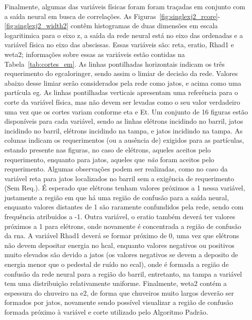 Finalmente, algumas das variáveis físicas foram foram traçadas em conjunto com
a saída neural em busca de correlações. As
Figuras~\ref{fig:singlexj2_rcore}-\ref{fig:singlexj2_width2} contêm histogramas
de duas dimensões em escala logaritimica para o eixo z, 
a saída da rede neural está no eixo das ordenadas e a
variável física no eixo das abscissas. Essas variáveis são: \gls{reta},
\gls{eratio}, \gls{Rhad1} e \gls{weta2}; informações sobre essas as variáveis estão
contidas na Tabela~\ref{tab:cortes_em}. As linhas pontilhadas horizontais
indicam os três requerimento do \gls{egcaloringer}, sendo assim o limiar de
decisão da rede. Valores abaixo desse limiar serão considerados pela rede como
jatos, e acima como uma partícula \gls{eg}. As linhas pontilhadas verticais
apresentam uma referência para o corte da variável física, mas não devem ser
levadas como o seu valor verdadeiro uma vez que os cortes variam conforme
\gls{eta} e \gls{Et}. Um conjunto de 16 figuras estão
disponíveis para cada variável, sendo as linhas elétrons 
incidindo no barril, jatos incidindo no barril, elétrons incidindo na tampa, e
jatos incidindo na tampa. As colunas indicam os requerimentos (ou a ausência de) exigidos para as
partículas, estando presente nas figuras, no caso de elétrons, aqueles aceitos pelo 
requerimento, enquanto para jatos, aqueles que \emph{não} foram aceitos pelo
requerimento. Algumas observações podem ser realizadas, como no caso da variável
\gls{reta} para jatos localizados no
barril sem a exigência de requerimento (Sem Req.). É esperado que elétrons
tenham valores próximos a 1 nessa variável, justamente a região em que há uma
região de confusão para a saída neural, enquanto valores distantes de 1 são
raramente confundidos pela rede, sendo com frequência atribuidos a -1. Outra
variável, o \gls{eratio} também deverá ter valores próximos a 1 para elétrons,
onde novamente é concentrada a região de confusão da \gls{rna}. A variável
\gls{Rhad1} deverá se formar próximo de 0, uma vez que elétrons não devem
depositar energia no \gls{hcal}, enquanto valores negativos ou positivos muito
elevados são devido a jatos (os valores negativos se devem a deposito de energia
menor que o pedestal de ruído no \gls{ecal}), onde é formada a região de
confusão da rede neural para a região do barril, entretanto, na tampa a variável
tem uma distribuição relativamente uniforme. Finalmente, \gls{weta2} contém a
espessura do chuveiro na \gls{e2}, de forma que chuveiros muito largos deverão
ser formados por jatos, novamente sendo possível visualizar a região de confusão
formada próximo à variável e corte utilizado pelo Algoritmo Padrão.



